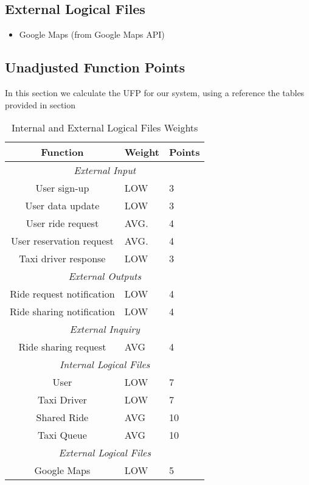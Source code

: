 \subsection{External Logical Files} %
\label{sub:internal_logical_files}
\begin{itemize}
	\item Google Maps (from Google Maps API)
\end{itemize}

\subsection{Unadjusted Function Points} %
\label{sub:unadjusted_function_points}
In this section we calculate the UFP for our system, using a reference the tables provided in section 

\begin{table}[h]
\caption{Internal and External Logical Files Weights}
\begin{tabularx}{\textwidth}{|c|X|X|}
\hline
\textbf{\textbf{Function}}      & \textbf{Weight} & \textbf{Points}  
\\ \hline
\multicolumn{3}{|c|}{\emph{External Input}}
\\ \hline
User sign-up 	& LOW  & 3		
\\ \hline						                
User data update & LOW & 3
\\ \hline	
User ride request & AVG. & 4	
\\ \hline
User reservation request & AVG. & 4
\\ \hline	
Taxi driver response & LOW & 3	
\\ \hline
\multicolumn{3}{|c|}{\emph{External Outputs}}
\\ \hline
Ride request notification & LOW & 4	
\\ \hline
Ride sharing notification & LOW & 4	
\\ \hline
\multicolumn{3}{|c|}{\emph{External Inquiry}}
\\ \hline
Ride sharing request & AVG & 4	
\\ \hline
\multicolumn{3}{|c|}{\emph{Internal Logical Files}}
\\ \hline
User & LOW & 7	
\\ \hline
Taxi Driver & LOW & 7	
\\ \hline
Shared Ride & AVG & 10	
\\ \hline
Taxi Queue & AVG & 10	
\\ \hline
\multicolumn{3}{|c|}{\emph{External Logical Files}}
\\ \hline
Google Maps & LOW & 5	
\\ \hline
\end{tabularx}
\end{table}


